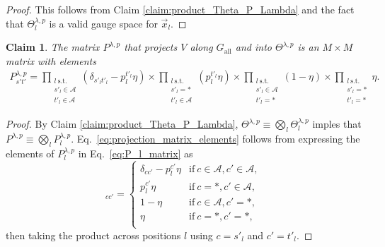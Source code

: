 \documentclass{article}
\numberwithin{myclaim}{section}
\newcommand{\eq}[1]{Eq.\ \ref{#1}}
\newtheorem{claim}{Claim}
\begin{document}
\begin{proof}
This follows from Claim \ref{claim:product_Theta_P_Lambda} and the fact that $\Theta^{\lambda,p}_l$ is a valid gauge space for $\vec{x}_l$.
\end{proof}

\begin{claim}
The matrix $P^{\lambda,p}$ that projects $V$ along $G_\mathrm{all}$ and into $\Theta^{\lambda,p}$ is an $M \times M$ matrix with elements
\begin{eqnarray}
    P^{\lambda,p}_{s' t'} 
        =\!\!\!
        \prod_{\substack{l\ \textrm{s.t.}\ \\ s'_l \in \mathcal{A} \\ t'_l \in \mathcal{A}  } }\!\!\! \left(\delta_{s'_l t'_l} - p^{t'_l}_l \eta \right)\!
        \times \!\!\!
        \prod_{\substack{l\ \textrm{s.t.}\ \\  s'_l = * \\ t'_l\in \mathcal{A} } }\!\!\! \left(p^{t'_l}_l \eta \right) \!
        \times \!\!\!
        \prod_{\substack{l\ \textrm{s.t.}\ \\ s'_l\in \mathcal{A} \\ t'_l = * } }\!\!\! \left(1 - \eta \right) \!
        \times \!\!\!
        \prod_{\substack{l\ \textrm{s.t.}\ \\ s'_l = * \\ t'_l = *} } \!\! \eta.
    \label{eq:projection_matrix_elements}
\end{eqnarray}
\end{claim}

\begin{proof}
By Claim \ref{claim:product_Theta_P_Lambda},  $\Theta^{\lambda,p} \equiv \bigotimes_l \Theta^{\lambda,p}_l$ imples that $P^{\lambda,p} \equiv \bigotimes_l P^{\lambda,p}_l$. \eq{eq:projection_matrix_elements} follows from expressing the elements of $P^{\lambda,p}_l$ in \eq{eq:P_l_matrix} as
\begin{equation}
	[P^{\lambda,p}]_{cc'} = \left\{ 
	\begin{array}{cl} 
		\delta_{cc'} - p_l^{c'} \eta 	& \textrm{if}~c \in \mathcal{A}, c' \in \mathcal{A}, \\
		p_l^{c'} \eta 					& \textrm{if}~c = *, c' \in \mathcal{A}, \\
		1 - \eta 						& \textrm{if}~c \in \mathcal{A}, c'= *, \\
		\eta 							& \textrm{if}~c = *, c' = *, \\
	\end{array} \right. 
\end{equation}
then taking the product across positions $l$ using $c = s'_l$ and $c'=t'_l$. 
\end{proof}
\end{document}
